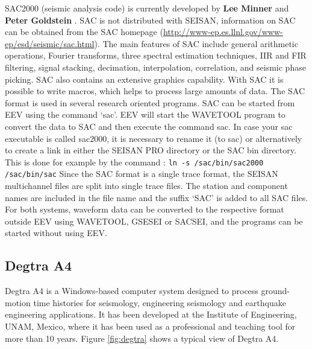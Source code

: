 SAC2000 (seismic analysis code) is currently developed by \textbf{Lee Minner} and \textbf{Peter Goldstein} \citep{goldstein1999}. SAC is not distributed with SEISAN, information on SAC can be obtained from the SAC homepage (\url{http://www-ep.es.llnl.gov/www-ep/esd/seismic/sac.html}). The main features of SAC include general arithmetic operations, Fourier transforms, three spectral estimation techniques, IIR and FIR filtering, signal stacking, decimation, interpolation, correlation, and seismic phase picking. SAC also contains an extensive graphics capability. 
With SAC it is possible to write macros, which helps to process large amounts of data. The SAC format is used in several research oriented programs. SAC can be started from EEV using the command `sac'. EEV will start the WAVETOOL program to convert the data to SAC and then execute the command sac. In case your sac executable is called sac2000, it is necessary to rename it (to sac) or alternatively to create a link in either the SEISAN PRO directory or the SAC bin directory. This is done for example by the command :\newline
\texttt{ln -s /sac/bin/sac2000 /sac/bin/sac} \newline 
Since the SAC format is a single trace format, the SEISAN multichannel files are split into single trace files. The station and component names are included in the file name and the suffix `SAC' is added to all SAC files. 
For both systems, waveform data can be converted to the respective format outside EEV using WAVETOOL, GSESEI or SACSEI, and the programs can be started without using EEV. 

\subsection{Degtra A4}


Degtra A4 is a Windows-based computer system designed to process 
ground-motion time histories for seismology, engineering seismology 
and earthquake engineering applications. It has been developed at 
the Institute of Engineering, UNAM, Mexico, where it has been used 
as a professional and teaching tool for more than 10 years. 
Figure \ref{fig:degtra} shows a typical view of Degtra A4. 

